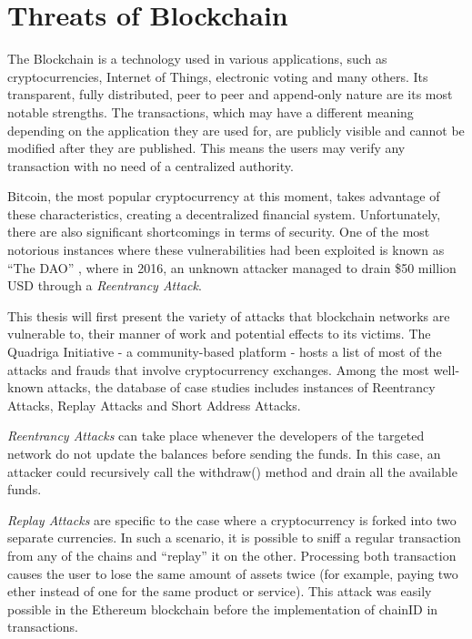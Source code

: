 \chapter{Threats of Blockchain}
The Blockchain \cite{blockchainAttacks} is a technology used in various applications, such as cryptocurrencies, Internet of Things, electronic voting and many others. Its transparent, fully distributed, peer to peer and append-only nature are its most notable strengths. The transactions, which may have a different meaning depending on the application they are used for, are publicly visible and cannot be modified after they are published. This means the users may verify any transaction with no need of a centralized authority.

Bitcoin, the most popular cryptocurrency at this moment, takes advantage of these characteristics, creating a decentralized financial system. Unfortunately, there are also significant shortcomings in terms of security. One of the most notorious instances where these vulnerabilities had been exploited is known as ``The DAO'' \cite{blockchainAttacks}, where in 2016, an unknown attacker managed to drain \$50 million USD through a \textit{Reentrancy Attack}.

This thesis will first present the variety of attacks that blockchain networks are vulnerable to, their manner of work and potential effects to its victims. The Quadriga Initiative \cite{quadriga}  - a community-based platform - hosts a list of most of the attacks and frauds that involve cryptocurrency exchanges. Among the most well-known attacks, the database of case studies includes instances of Reentrancy Attacks, Replay Attacks and Short Address Attacks.

\textit{Reentrancy Attacks} \cite{reentrancy} can take place whenever the developers of the targeted network do not update the balances before sending the funds. In this case, an attacker could recursively call the withdraw() method and drain all the available funds. 

\textit{Replay Attacks} \cite{replay} are specific to the case where a cryptocurrency is forked into two separate currencies. In such a scenario, it is possible to sniff a regular transaction from any of the chains and “replay” it on the other. Processing both transaction causes the user to lose the same amount of assets twice (for example, paying two ether instead of one for the same product or service). This attack was easily possible in the Ethereum blockchain before the implementation of chainID in transactions.

